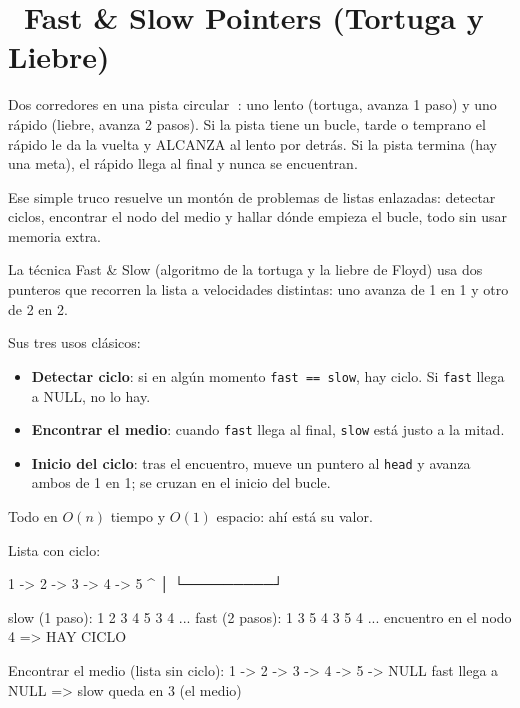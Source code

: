 \chapter[\emj{🐢}~Fast \& Slow Pointers (Tortuga y Liebre)]{~Fast \& Slow Pointers (Tortuga y Liebre)}

\begin{dsaquees}

Dos corredores en una pista circular 🏃: uno lento (tortuga, avanza 1
paso) y uno rápido (liebre, avanza 2 pasos). Si la pista tiene un bucle,
tarde o temprano el rápido le da la vuelta y ALCANZA al lento por
detrás. Si la pista termina (hay una meta), el rápido llega al final y
nunca se encuentran.

Ese simple truco resuelve un montón de problemas de listas enlazadas:
detectar ciclos, encontrar el nodo del medio y hallar dónde empieza el
bucle, todo sin usar memoria extra.

\end{dsaquees}

\begin{dsaotraforma}

La técnica Fast \& Slow (algoritmo de la tortuga y la liebre de Floyd)
usa dos punteros que recorren la lista a velocidades distintas: uno
avanza de 1 en 1 y otro de 2 en 2.

Sus tres usos clásicos:
\begin{itemize}
\item \textbf{Detectar ciclo}: si en algún momento \verb|fast == slow|,
      hay ciclo. Si \verb|fast| llega a NULL, no lo hay.
\item \textbf{Encontrar el medio}: cuando \verb|fast| llega al final,
      \verb|slow| está justo a la mitad.
\item \textbf{Inicio del ciclo}: tras el encuentro, mueve un puntero al
      \verb|head| y avanza ambos de 1 en 1; se cruzan en el inicio del
      bucle.
\end{itemize}

Todo en $O(n)$ tiempo y $O(1)$ espacio: ahí está su valor.

\end{dsaotraforma}

\begin{dsadiagrama}
Lista con ciclo:

  1 -> 2 -> 3 -> 4 -> 5
            ^         │
            └─────────┘

slow (1 paso):  1  2  3  4  5  3  4 ...
fast (2 pasos): 1  3  5  4  3  5  4 ...
                      encuentro en el nodo 4  => HAY CICLO

Encontrar el medio (lista sin ciclo):
  1 -> 2 -> 3 -> 4 -> 5 -> NULL
fast llega a NULL  =>  slow queda en 3 (el medio)
\end{dsadiagrama}


